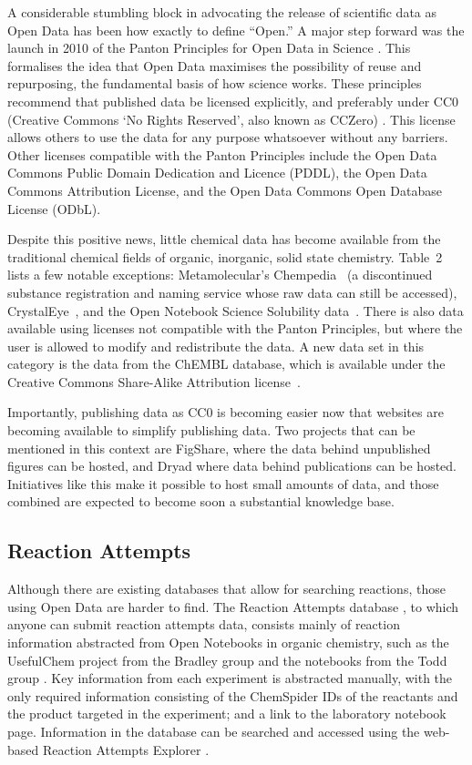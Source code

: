 \documentclass[10pt]{bmc_article}
\newenvironment{bmcformat}{\fussy\setboolean{publ}{true}}{\fussy}
\begin{document}
\begin{bmcformat}
A considerable stumbling block in advocating the release of scientific
data as Open Data has been how exactly to define ``Open.'' A major step
forward was the launch in 2010 of the Panton Principles for Open Data
in Science \cite{WebPanton}. This formalises the idea that Open Data maximises the
possibility of reuse and repurposing, the fundamental basis
of how science works. These principles recommend that published data
be licensed explicitly, and preferably under CC0 (Creative Commons `No
Rights Reserved', also known as CCZero) \cite{WebCC0}. This license allows others to use the
data for any purpose whatsoever without any barriers. Other licenses
compatible with the Panton Principles include the
Open Data Commons Public Domain Dedication and Licence (PDDL), the
Open Data Commons Attribution License, and the
Open Data Commons Open Database License (ODbL).\cite{WebOpenData}

Despite this positive news, little chemical data has become
available from the traditional chemical fields of organic,
inorganic, solid state chemistry. Table~2 lists a few notable
exceptions: Metamolecular's Chempedia~\cite{Chempedia} (a discontinued substance registration
and naming service whose raw data can still be accessed),
CrystalEye~\cite{WebCrystalEye},
and the Open Notebook Science Solubility
data~\cite{ONS2010}. There is also data available using licenses
not compatible with the Panton Principles, but where the user
is allowed to modify and redistribute the data. A new data
set in this category is the data from the ChEMBL database,
which is available under the Creative Commons Share-Alike
Attribution license~\cite{Overington2009}.

Importantly, publishing data as CC0 is becoming easier now that
websites are becoming available to simplify publishing data. Two
projects that can be mentioned in this context are
FigShare\cite{WebFigShare}, where the data behind unpublished figures
can be hosted, and Dryad\cite{WebDryad} where data behind publications
can be hosted. Initiatives like this make it possible to host small
amounts of data, and those combined are expected to become soon a
substantial knowledge base. 

\subsection*{Reaction Attempts}
Although there are existing databases that allow for searching reactions, those
using Open Data are harder to find. The Reaction Attempts database
\cite{ReactionAttempts}, to which anyone can
submit reaction attempts data, consists mainly of reaction information
abstracted from Open Notebooks in organic chemistry, such as the
UsefulChem project from the Bradley group
\cite{UsefulChemReactionAttempts}
and the notebooks from the Todd group \cite{UsefulChemTodd}.
Key information from each experiment is abstracted manually, with the
only required information consisting of the ChemSpider IDs of the
reactants and the product targeted in the experiment; and a link to
the laboratory notebook page. Information in the database can be
searched and accessed using the web-based Reaction Attempts Explorer
\cite{ReactionAttemptsExplorer}.


\end{bmcformat}
\end{document}
